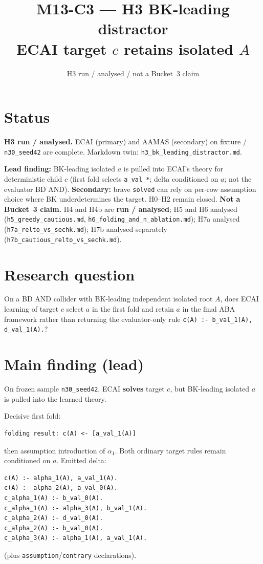 \documentclass[11pt]{article}
\title{M13-C3 --- H3 BK-leading distractor\\
ECAI target \(c\) retains isolated \(A\)}
\author{}
\date{H3 run / analysed / not a Bucket~3 claim}
\begin{document}
\maketitle

\section{Status}

\textbf{H3 run / analysed.}
ECAI (primary) and AAMAS (secondary) on fixture
 / \texttt{n30\_seed42} are complete.
Markdown twin: \texttt{h3\_bk\_leading\_distractor.md}.

\textbf{Lead finding:} BK-leading isolated \(a\) is pulled into ECAI's theory
for deterministic child \(c\) (first fold selects \texttt{a\_val\_*}; delta
conditioned on \(a\); not the evaluator BD AND).
\textbf{Secondary:} brave \texttt{solved} can rely on per-row assumption choice
where BK underdetermines the target.
H0--H2 remain closed.
\textbf{Not a Bucket~3 claim.}
H4 and H4b are \textbf{run / analysed};
H5 and H6 analysed (\texttt{h5\_greedy\_cautious.md},
\texttt{h6\_folding\_and\_n\_ablation.md}); H7a analysed
(\texttt{h7a\_relto\_vs\_sechk.md}); H7b analysed separately
(\texttt{h7b\_cautious\_relto\_vs\_sechk.md}).

\section{Research question}

On a BD AND collider with BK-leading independent isolated root \(A\), does
ECAI learning of target \(c\) select \(a\) in the first fold and retain \(a\)
in the final ABA framework rather than returning the evaluator-only rule
\texttt{c(A) :- b\_val\_1(A), d\_val\_1(A).}?

\section{Main finding (lead)}

On frozen sample \texttt{n30\_seed42}, ECAI \textbf{solves} target \(c\), but
BK-leading isolated \(a\) is pulled into the learned theory.

Decisive first fold:
\begin{verbatim}
folding result: c(A) <- [a_val_1(A)]
\end{verbatim}
then assumption introduction of \(\alpha_1\).
Both ordinary target rules remain conditioned on \(a\).
Emitted delta:
\begin{verbatim}
c(A) :- alpha_1(A), a_val_1(A).
c(A) :- alpha_2(A), a_val_0(A).
c_alpha_1(A) :- b_val_0(A).
c_alpha_1(A) :- alpha_3(A), b_val_1(A).
c_alpha_2(A) :- d_val_0(A).
c_alpha_2(A) :- b_val_0(A).
c_alpha_3(A) :- alpha_1(A), a_val_1(A).
\end{verbatim}
(plus \texttt{assumption}/\texttt{contrary} declarations).
\end{document}
